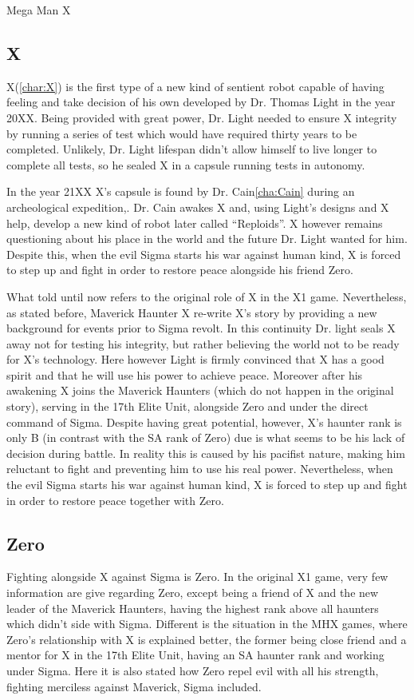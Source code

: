 \documentclass[openany]{report}
\begin{document}
\begin{chapter}{Mega Man X}
	\subsection{X}
	X(\ref{char:X}) is the first type of a new kind of sentient robot capable of having feeling and take decision of his own developed by Dr. Thomas Light in the year 20XX. Being provided with great power, Dr. Light needed to ensure X integrity by running a series of test which would have required thirty years to be completed. Unlikely, Dr. Light lifespan didn't allow himself to live longer to complete all tests, so he sealed X in a capsule running tests in autonomy.
	
	In the year 21XX X's capsule is found by Dr. Cain\ref{cha:Cain} during an archeological expedition\cite{X:Cain_journal},\cite{wiki:Cain_journal}. Dr. Cain awakes X and, using Light's designs and X help, develop a new kind of robot later called ``Reploids''. X however remains questioning about his place in the world and the future Dr. Light wanted for him. Despite this, when the evil Sigma starts his war against human kind, X is forced to step up and fight in order to restore peace alongside his friend Zero. 
	
	
	What told until now refers to the original role of X in the X1 game. Nevertheless, as stated before, Maverick Haunter X re-write X's story by providing a new background for events prior to Sigma revolt. In this continuity Dr. light seals X away not for testing his integrity, but rather believing the world not to be ready for X's technology. Here however Light is firmly convinced that X has a good spirit and that he will use his power to achieve peace\cite{wiki:MM_MHX_X}. Moreover after his awakening X joins the Maverick Haunters (which do not happen in the original story), serving in the 17th Elite Unit, alongside Zero and under the direct command of Sigma. Despite having great potential, however, X's haunter rank is only B (in contrast with the SA rank of Zero) due is what seems to be his lack of decision during battle. In reality this is caused by his pacifist nature, making him reluctant to fight and preventing him to use his real power\cite{Xcoll1:Manual_X1}. Nevertheless, when the evil Sigma starts his war against human kind, X is forced to step up and fight in order to restore peace together with Zero.
	\subsection{Zero}
	Fighting alongside X against Sigma is Zero. In the original X1 game, very few information are give regarding Zero, except being a friend of X and the new leader of the Maverick Haunters\cite{X:Cain_journal}, having the highest rank above all haunters which didn't side with Sigma. 
	Different is the situation in the MHX games, where Zero's relationship with X is explained better, the former being close friend and a mentor for X in the 17th Elite Unit, having an SA haunter rank and working under Sigma. Here it is also stated how Zero repel evil with all his strength, fighting merciless against Maverick, Sigma included\cite{Xcoll1:Manual_X1}.  
	

\end{chapter}
\end{document}
